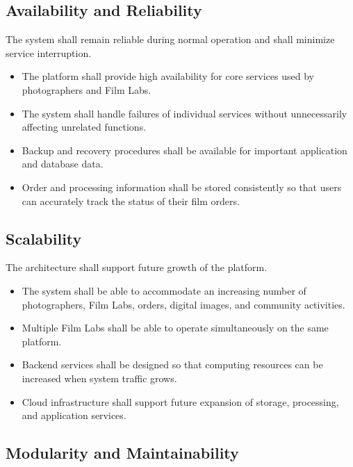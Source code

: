 \subsection{Availability and Reliability}

The system shall remain reliable during normal operation and shall minimize
service interruption.

\begin{itemize}
    \item The platform shall provide high availability for core services
    used by photographers and Film Labs.

    \item The system shall handle failures of individual services without
    unnecessarily affecting unrelated functions.

    \item Backup and recovery procedures shall be available for important
    application and database data.

    \item Order and processing information shall be stored consistently so
    that users can accurately track the status of their film orders.
\end{itemize}

\subsection{Scalability}

The architecture shall support future growth of the platform.

\begin{itemize}
    \item The system shall be able to accommodate an increasing number of
    photographers, Film Labs, orders, digital images, and community activities.

    \item Multiple Film Labs shall be able to operate simultaneously on the
    same platform.

    \item Backend services shall be designed so that computing resources can
    be increased when system traffic grows.

    \item Cloud infrastructure shall support future expansion of storage,
    processing, and application services.
\end{itemize}

\subsection{Modularity and Maintainability}

